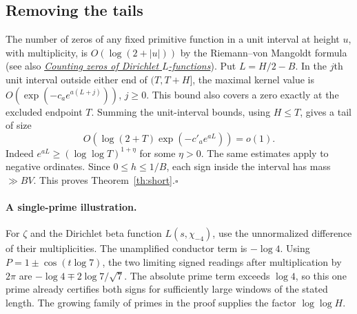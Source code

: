 \subsection{Removing the tails}
The number of zeros of any fixed primitive function in a unit interval
at height $u$, with multiplicity, is $O(\log(2+|u|))$ by the
Riemann--von Mangoldt formula (see also
\href{https://doi.org/10.1090/mcom/3599}{\emph{Counting zeros of Dirichlet
$L$-functions}}). Put $L=H/2-B$. In the $j$th unit interval outside either
end of $(T,T+H]$, the maximal kernel value is
$O(\exp(-c_a e^{a(L+j)}))$, $j\ge0$. This bound also covers a zero
exactly at the excluded endpoint $T$. Summing the unit-interval bounds,
using $H\le T$, gives a tail of size
\[
 O\!\left(\log(2+T)\exp(-c'_a e^{aL})\right)=o(1).
\]
Indeed $e^{aL}\ge(\log\log T)^{1+\eta}$ for some $\eta>0$.
The same estimates apply to negative ordinates. Since $0\le h\le1/B$,
each sign inside the interval has mass $\gg B V$. This proves
Theorem~\ref{th:short}.\hfill$\square$

\paragraph{A single-prime illustration.}
For $\zeta$ and the Dirichlet beta function $L(s,\chi_{-4})$, use the
unnormalized difference of their multiplicities. The unamplified conductor
term is $-\log 4$. Using $P=1\pm\cos(t\log7)$, the two limiting
signed readings after multiplication by $2\pi$ are
$-\log4\mp 2\log7/\sqrt7$. The absolute prime term exceeds $\log4$,
so this one prime already certifies both signs for sufficiently large
windows of the stated length. The growing family of primes in the proof
supplies the factor $\log\log H$.
